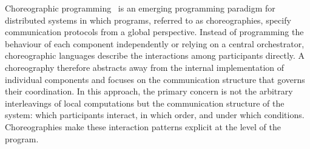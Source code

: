 Choreographic programming~\cite{M23} is an emerging programming
paradigm for distributed systems in which programs, referred to as
choreographies, specify communication protocols from a global
perspective. Instead of programming the behaviour of each component
independently or relying on a central orchestrator, choreographic
languages describe the interactions among participants directly. A
choreography therefore abstracts away from the internal implementation
of individual components and focuses on the communication structure
that governs their coordination.
%
In this approach, the primary concern is not the arbitrary
interleavings of local computations but the communication structure of
the system: which participants interact, in which order, and under
which conditions. Choreographies make these interaction patterns
explicit at the level of the program.
%


